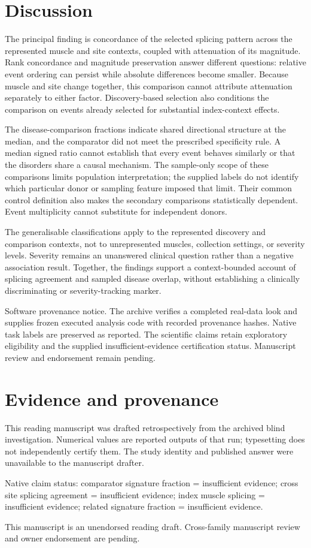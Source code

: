 \documentclass[10pt,a4paper]{article}
\begin{document}
\section*{Discussion}
The principal finding is concordance of the selected splicing pattern across the represented muscle and site contexts, coupled with attenuation of its magnitude. Rank concordance and magnitude preservation answer different questions: relative event ordering can persist while absolute differences become smaller. Because muscle and site change together, this comparison cannot attribute attenuation separately to either factor. Discovery-based selection also conditions the comparison on events already selected for substantial index-context effects.
\par
The disease-comparison fractions indicate shared directional structure at the median, and the comparator did not meet the prescribed specificity rule. A median signed ratio cannot establish that every event behaves similarly or that the disorders share a causal mechanism. The sample-only scope of these comparisons limits population interpretation; the supplied labels do not identify which particular donor or sampling feature imposed that limit. Their common control definition also makes the secondary comparisons statistically dependent. Event multiplicity cannot substitute for independent donors.
\par
The generalisable classifications apply to the represented discovery and comparison contexts, not to unrepresented muscles, collection settings, or severity levels. Severity remains an unanswered clinical question rather than a negative association result. Together, the findings support a context-bounded account of splicing agreement and sampled disease overlap, without establishing a clinically discriminating or severity-tracking marker.
\par
Software provenance notice. The archive verifies a completed real-data look and supplies frozen executed analysis code with recorded provenance hashes. Native task labels are preserved as reported. The scientific claims retain exploratory eligibility and the supplied insufficient-evidence certification status. Manuscript review and endorsement remain pending.
\par
\section*{Evidence and provenance}
This reading manuscript was drafted retrospectively from the archived blind investigation. Numerical values are reported outputs of that run; typesetting does not independently certify them. The study identity and published answer were unavailable to the manuscript drafter.
\par
Native claim status: comparator signature fraction = insufficient evidence; cross site splicing agreement = insufficient evidence; index muscle splicing = insufficient evidence; related signature fraction = insufficient evidence.
\par
This manuscript is an unendorsed reading draft. Cross-family manuscript review and owner endorsement are pending.
\par
\end{document}
